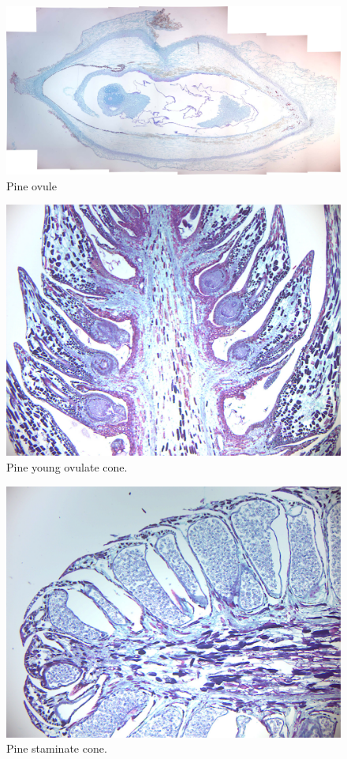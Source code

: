 \begin{figure}

{\centering \includegraphics[width=0.7\linewidth]{./figures/gymnosperms/pine_ovule}

}

\caption{Pine ovule}\label{fig:pine}
\end{figure}

\begin{figure}

{\centering \includegraphics[width=0.7\linewidth]{./figures/gymnosperms/pine_ovulate}

}

\caption{Pine young ovulate cone.}\label{fig:ovulate}
\end{figure}

\begin{figure}

{\centering \includegraphics[width=0.7\linewidth]{./figures/gymnosperms/pine_staminate}

}

\caption{Pine staminate cone.}\label{fig:staminate}
\end{figure}

